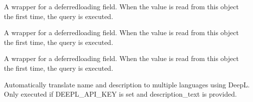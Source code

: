 \documentclass[letterpaper,10pt,french]{sphinxmanual}
\begin{document}
\begin{fulllineitems}
\begin{fulllineitems}
\end{fulllineitems}


\begin{fulllineitems}
\label{\detokenize{index:bookings.models.MobileHome.worker_price_1p}}
\pysigstartsignatures
\pysigline
{}
\pysigstopsignatures
\sphinxAtStartPar
A wrapper for a deferred\sphinxhyphen{}loading field. When the value is read from this
object the first time, the query is executed.

\end{fulllineitems}


\begin{fulllineitems}
\label{\detokenize{index:bookings.models.MobileHome.worker_price_2p}}
\pysigstartsignatures
\pysigline
{}
\pysigstopsignatures
\sphinxAtStartPar
A wrapper for a deferred\sphinxhyphen{}loading field. When the value is read from this
object the first time, the query is executed.

\end{fulllineitems}


\begin{fulllineitems}
\label{\detokenize{index:bookings.models.MobileHome.worker_price_3p}}
\pysigstartsignatures
\pysigline
{}
\pysigstopsignatures
\sphinxAtStartPar
A wrapper for a deferred\sphinxhyphen{}loading field. When the value is read from this
object the first time, the query is executed.

\end{fulllineitems}


\begin{fulllineitems}
\label{\detokenize{index:bookings.models.MobileHome.save}}
\pysigstartsignatures
\pysiglinewithargsret
{}
{\sphinxparamcomma {}}
{}
\pysigstopsignatures
\sphinxAtStartPar
Automatically translate name and description to multiple languages using DeepL.
Only executed if DEEPL\_API\_KEY is set and description\_text is provided.


\end{fulllineitems}
\end{fulllineitems}
\end{document}
